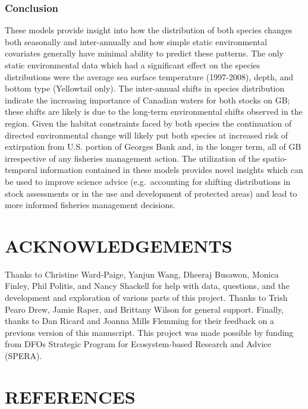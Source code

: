 \documentclass[
]{article}
\begin{document}
\hypertarget{conclusion}{%
\subsubsection{Conclusion}\label{conclusion}}

These models provide insight into how the distribution of both species changes both seasonally and inter-annually and how simple static environmental covariates generally have minimal ability to predict these patterns. The only static environmental data which had a significant effect on the species distributions were the average sea surface temperature (1997-2008), depth, and bottom type (Yellowtail only). The inter-annual shifts in species distribution indicate the increasing importance of Canadian waters for both stocks on GB; these shifts are likely is due to the long-term environmental shifts observed in the region. Given the habitat constraints faced by both species the continuation of directed environmental change will likely put both species at increased risk of extirpation from U.S. portion of Georges Bank and, in the longer term, all of GB irrespective of any fisheries management action. The utilization of the spatio-temporal information contained in these models provides novel insights which can be used to improve science advice (e.g.~accounting for shifting distributions in stock assessments or in the use and development of protected areas) and lead to more informed fisheries management decisions.

\hypertarget{acknowledgements}{%
\section{ACKNOWLEDGEMENTS}\label{acknowledgements}}

Thanks to Christine Ward-Paige, Yanjun Wang, Dheeraj Busawon, Monica Finley, Phil Politis, and Nancy Shackell for help with data, questions, and the development and exploration of various parts of this project. Thanks to Trish Pearo Drew, Jamie Raper, and Brittany Wilson for general support. Finally, thanks to Dan Ricard and Joanna Mills Flemming for their feedback on a previous version of this manuscript. This project was made possible by funding from DFOs Strategic Program for Ecosystem-based Research and Advice (SPERA).

\clearpage

\newpage

\hypertarget{references}{%
\section*{REFERENCES}\label{references}}
\end{document}

